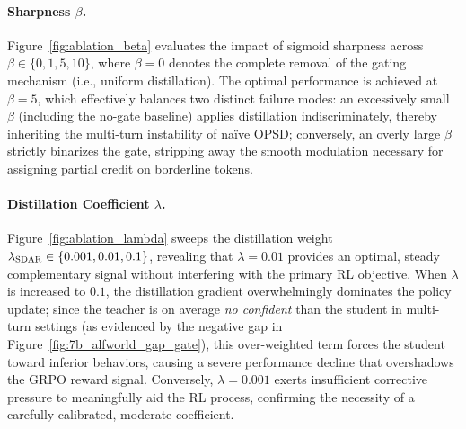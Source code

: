 \documentclass{article} %
\newcommand{\methodname}{\textsc{SDAR}\xspace}
\begin{document}
\paragraph{Sharpness $\beta$.} Figure~\ref{fig:ablation_beta} evaluates the impact of sigmoid sharpness across $\beta \in \{0, 1, 5, 10\}$, where $\beta = 0$ denotes the complete removal of the gating mechanism (i.e., uniform distillation). The optimal performance is achieved at $\beta = 5$, which effectively balances two distinct failure modes: an excessively small $\beta$ (including the no-gate baseline) applies distillation indiscriminately, thereby inheriting the multi-turn instability of na\"ive OPSD; conversely, an overly large $\beta$ strictly binarizes the gate, stripping away the smooth modulation necessary for assigning partial credit on borderline tokens.

\paragraph{Distillation Coefficient $\lambda$.} Figure~\ref{fig:ablation_lambda} sweeps the distillation weight $\lambda_{\methodname} \in \{0.001, 0.01, 0.1\}$, revealing that $\lambda = 0.01$ provides an optimal, steady complementary signal without interfering with the primary RL objective. When $\lambda$ is increased to $0.1$, the distillation gradient overwhelmingly dominates the policy update; since the teacher is on average \emph{no confident} than the student in multi-turn settings (as evidenced by the negative gap in Figure~\ref{fig:7b_alfworld_gap_gate}), this over-weighted term forces the student toward inferior behaviors, causing a severe performance decline that overshadows the GRPO reward signal. Conversely, $\lambda = 0.001$ exerts insufficient corrective pressure to meaningfully aid the RL process, confirming the necessity of a carefully calibrated, moderate coefficient.
\end{document}
